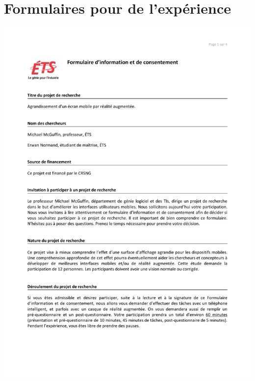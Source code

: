 \chapter{Formulaires pour de l'expérience}
\label{appendix:experiment_forms}

\includegraphics[page=1, scale=0.8, trim={2cm 2.4cm 0cm 2.8cm}, clip]{content/8_experiment_forms_1.pdf}


